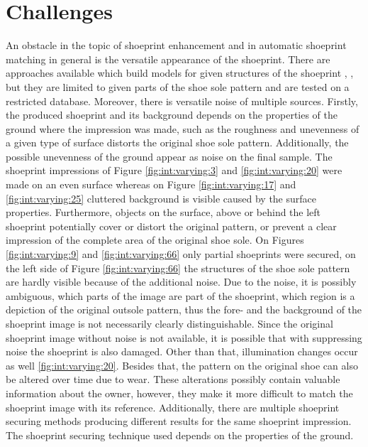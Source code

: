 \documentclass[draft,final]{vutinfth} %
\begin{document}
\section{Challenges}
\par
An obstacle in the topic of shoeprint enhancement and in automatic shoeprint matching in general is the versatile appearance of the shoeprint.
There are approaches available which build models for given structures of the shoeprint \cite{tang2010footwear}, \cite{alizadeh2017automatic}, but they are limited to given parts of the shoe sole pattern and are tested on a restricted database.
Moreover, there is versatile noise of multiple sources.
Firstly, the produced shoeprint and its background depends on the properties of the ground where the impression was made, such as the roughness and unevenness of a given type of surface distorts the original shoe sole pattern.
Additionally, the possible unevenness of the ground appear as noise on the final sample.
The shoeprint impressions of Figure \ref{fig:int:varying:3} and \ref{fig:int:varying:20} were made on an even surface whereas on Figure \ref{fig:int:varying:17} and \ref{fig:int:varying:25} cluttered background is visible caused by the surface properties.
Furthermore, objects on the surface, above or behind the left shoeprint potentially cover or distort the original pattern, or prevent a clear impression of the complete area of the original shoe sole.
On Figures \ref{fig:int:varying:9} and \ref{fig:int:varying:66} only partial shoeprints were secured, on the left side of Figure \ref{fig:int:varying:66} the structures of the shoe sole pattern are hardly visible because of the additional noise.
Due to the noise, it is possibly ambiguous, which parts of the image are part of the shoeprint, which region is a depiction of the original outsole pattern, thus the fore- and the background of the shoeprint image is not necessarily clearly distinguishable.
Since the original shoeprint image without noise is not available, it is possible that with  suppressing noise the shoeprint is also damaged.
Other than that, illumination changes occur as well \ref{fig:int:varying:20}.
Besides that, the pattern on the original shoe can also be altered over time due to wear.
These alterations possibly contain valuable information about the owner, however, they make it more difficult to match the shoeprint image with its reference.
Additionally, there are multiple shoeprint securing methods producing different results for the same shoeprint impression\cite{katireddy2017novel}. 
The shoeprint securing technique used depends on the properties of the ground. 
\end{document}
